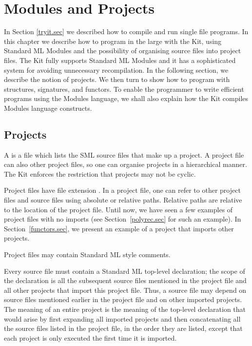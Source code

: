 \documentclass[12pt]{book}
\begin{document}
\chapter{Modules and Projects}
\label{modules_and_projects.chap}
In Section \ref{tryit.sec} we described how to compile and run single
file programs. In this chapter we describe how to program in the
large with the Kit, using Standard ML Modules and the possibility of
organising source files into project files. The Kit fully supports
Standard ML Modules and it has a sophisticated system for avoiding
unnecessary recompilation. In the following section, we describe the
notion of projects. We then turn to show how to program 
with structures, signatures, and functors. To enable the programmer
to write efficient programs using the Modules language, we
shall also explain how the Kit compiles Modules language constructs.


\section{Projects \label{projects.sec}}
A  is a file which lists the SML source files
that make up a project. A project file can also 
 other
project files, so one can organise projects in a hierarchical manner.
The Kit enforces the restriction that projects may not be cyclic.

Project files have file extension . In a project file, one
can refer to other project files and source files using  absolute
or relative paths. 
Relative paths are relative to the location of the
project file. Until now, we have seen a few examples of project files
with no imports (see Section~\ref{polyrec.sec} for such an
example). In Section~\ref{functors.sec}, we present an
example of a project that imports other projects.  

Project files may contain Standard ML 
style comments.

Every source file must contain a Standard ML top-level declaration;
the scope of the declaration is all the subsequent source files
mentioned in the project file and all other projects that import
this project file. Thus, a source file may depend on source files
mentioned earlier in the project file and on other imported projects.
The meaning of an entire project is the meaning of the top-level
declaration that would arise by first expanding all imported projects
and then concatenating all the source files listed in the project
file, in the order they are listed, except that each project is 
only executed the first time it is imported. 
\end{document}
